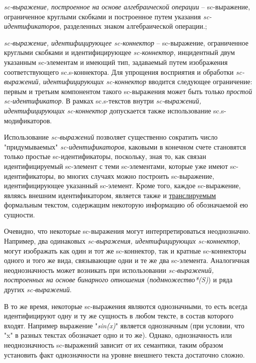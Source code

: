 \begin{textitemize}
	\item{\textit{sc-выражение, построенное на основе алгебраической операции} -- sc-выражение, ограниченное круглыми скобками и построенное путем указания \textit{sc-идентификаторов}, разделенных знаком алгебраической операции.};
	\item{\textit{sc-выражение, идентифицирующее sc-коннектор} -- sc-выражение, ограниченное круглыми скобками и идентифицирующее \textit{sc-коннектор}, инцидентный двум указанным sc-элементам и имеющий тип, задаваемый путем изображения соответствующего sc.s-коннектора.
	Для упрощения восприятия и обработки \textit{sc-выражений, идентифицирующих sc-коннектор} вводится следующее ограничение: первым и третьим компонентом такого sc-выражения может быть только \textit{простой sc-идентификатор}. В рамках sc.s-текстов внутри \textit{sc-выражений, идентифицирующих sc-коннектор} допускается также использование sc.s-модификаторов.}	
\end{textitemize}


Использование \textit{sc-выражений} позволяет существенно сократить число "придумываемых"{} \textit{sc-идентификаторов}, каковыми в конечном счете становятся только простые sc-идентификаторы, поскольку, зная то, как связан идентифицируемый sc-элемент с теми sc-элементами, которые уже имеют sc-идентификаторы, во многих случаях можно построить sc-выражение, идентифицирующее указанный sc-элемент. Кроме того, каждое sc-выражение, являясь внешним идентификатором, является также и \uline{транслируемым} формальным текстом, содержащим некоторую информацию об обозначаемой ею сущности.

Очевидно, что некоторые sc-выражения могут интерпретироваться неоднозначно. Например, два одинаковых \textit{sc-выражения, идентифицирующих sc-коннектор}, могут изображать как один и тот же sc-коннектор, так и кратные sc-коннекторы одного и того же вида, связывающие одни и те же два sc-элемента. Аналогичная неоднозначность может возникать при использовании \textit{sc-выражений, построенных на основе бинарного отношения} (\textit{подмножество*(S)}) и ряда других \textit{sc-выражений}.

В то же время, некоторые sc-выражения являются однозначными, то есть всегда идентифицируют одну и ту же сущность в любом тексте, в состав которого входят. Например выражение "\textit{sin(x)}"{} является однозначным (при условии, что "x"{} в разных текстах обозначает одно и то же). Однако, однозначность или неоднозначность sc-выражений зависит от их семантики, таким образом установить факт однозначности на уровне внешнего текста достаточно сложно.

